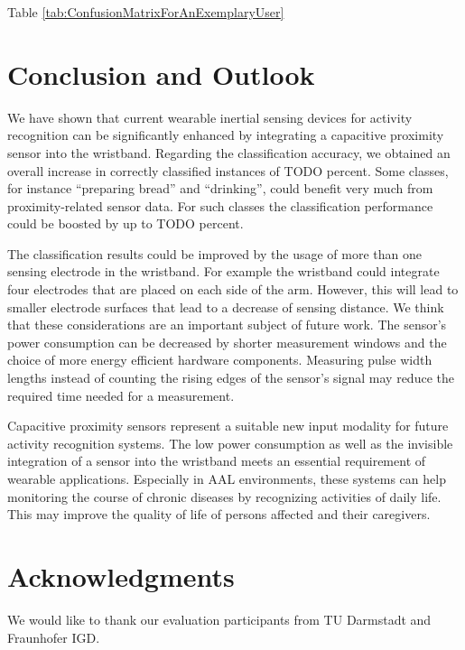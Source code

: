\documentclass[runningheads,a4paper]{llncs}
\begin{document}
Table \ref{tab:ConfusionMatrixForAnExemplaryUser} 

\section{Conclusion and Outlook}
\label{sect:conclusions}

We have shown that current wearable inertial sensing devices for activity recognition can be significantly enhanced by integrating a capacitive proximity sensor into the wristband. Regarding the classification accuracy, we obtained an overall increase in correctly classified instances of TODO percent. Some classes, for instance ``preparing bread'' and ``drinking'', could benefit very much from proximity-related sensor data. For such classes the classification performance could be boosted by up to TODO percent. 

The classification results could be improved by the usage of more than one sensing electrode in the wristband. For example the wristband could integrate four electrodes that are placed on each side of the arm. However, this will lead to smaller electrode surfaces that lead to a decrease of sensing distance. We think that these considerations are an important subject of future work. The sensor's power consumption can be decreased by shorter measurement windows and the choice of more energy efficient hardware components. Measuring pulse width lengths instead of counting the rising edges of the sensor's signal may reduce the required time needed for a measurement.

Capacitive proximity sensors represent a suitable new input modality for future activity recognition systems. The low power consumption as well as the invisible integration of a sensor into the wristband meets an essential requirement of wearable applications. Especially in AAL environments, these systems can help monitoring the course of chronic diseases by recognizing activities of daily life. This may improve the quality of life of persons affected and their caregivers. 

\section*{Acknowledgments}

We would like to thank our evaluation participants from TU Darmstadt and Fraunhofer IGD.




\end{document}
